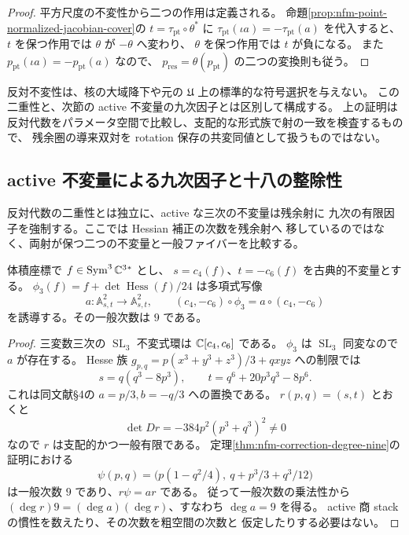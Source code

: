 \begin{proof}
平方尺度の不変性から二つの作用は定義される。
命題\ref{prop:nfm-point-normalized-jacobian-cover}の
$t=\tau_{\mathrm{pt}}\circ\theta^*$ に
$\tau_{\mathrm{pt}}(\iota a)=-\tau_{\mathrm{pt}}(a)$ を代入すると、
$t$ を保つ作用では $\theta$ が $-\theta$ へ変わり、
$\theta$ を保つ作用では $t$ が負になる。
また $p_{\mathrm{pt}}(\iota a)=-p_{\mathrm{pt}}(a)$ なので、
$p_{\mathrm{res}}=\theta(p_{\mathrm{pt}})$ の二つの変換則も従う。
\end{proof}

反対不変性は、核の大域降下や元の $\mathfrak U$ 上の標準的な符号選択を与えない。
この二重性と、次節の active 不変量の九次因子とは区別して構成する。
上の証明は反対代数をパラメータ空間で比較し、支配的な形式族で射の一致を検査するもので、
残余圏の導来双対を rotation 保存の共変同値として扱うものではない。


\subsection{active 不変量による九次因子と十八の整除性}

反対代数の二重性とは独立に、active な三次の不変量は残余射に
九次の有限因子を強制する。ここでは Hessian 補正の次数を残余射へ
移しているのではなく、両射が保つ二つの不変量と一般ファイバーを比較する。

\begin{lemma}
\label{lem:nfm-active-invariant-degree-nine}
体積座標で $f\in\operatorname{Sym}^3\mathbb C^3{}^*$ とし、
$s=c_4(f)$、$t=-c_6(f)$ を古典的不変量とする。
$\phi_3(f)=f+\det\operatorname{Hess}(f)/24$ は多項式写像
\[
 a:\mathbb A^2_{s,t}\longrightarrow\mathbb A^2_{s,t},
 \qquad (c_4,-c_6)\circ\phi_3=a\circ(c_4,-c_6)
\]
を誘導する。その一般次数は $9$ である。
\end{lemma}

\begin{proof}
三変数三次の $\operatorname{SL}_3$ 不変式環は
$\mathbb C[c_4,c_6]$ である\cite[Theorem~1.1]{NFMFisherTernary}。
$\phi_3$ は $\operatorname{SL}_3$ 同変なので $a$ が存在する。
Hesse 族 $g_{p,q}=p(x^3+y^3+z^3)/3+qxyz$ への制限では
\begin{equation}\label{eq:nfm-active-invariant-hesse}
 s=q(q^3-8p^3),\qquad t=q^6+20p^3q^3-8p^6.
\end{equation}
これは同文献\S4の $a=p/3,b=-q/3$ への置換である。
$r(p,q)=(s,t)$ とおくと
\[
 \det Dr=-384p^2(p^3+q^3)^2\ne0
\]
なので $r$ は支配的かつ一般有限である。
定理\ref{thm:nfm-correction-degree-nine}の証明における
\[
 \psi(p,q)=\bigl(p(1-q^2/4),\ q+p^3/3+q^3/12\bigr)
\]
は一般次数 $9$ であり、$r\psi=ar$ である。
従って一般次数の乗法性から
$(\deg r)9=(\deg a)(\deg r)$、すなわち $\deg a=9$ を得る。
active 商 stack の慣性を数えたり、その次数を粗空間の次数と
仮定したりする必要はない。
\end{proof}

